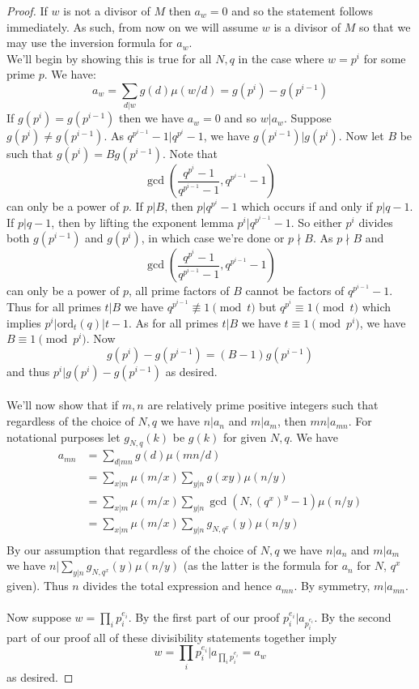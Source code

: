 \documentclass{article}
\newcommand{\ord}[0]{\mathrm{ord}}
\theoremstyle{definition}
\theoremstyle{definition}
\theoremstyle{remark}
\begin{document}
\begin{proof}
If $w$ is not a divisor of $M$ then $a_w = 0$ and so the statement follows immediately. As such, from now on we will assume $w$ is a divisor of $M$ so that we may use the inversion formula for $a_w$.
\\
We'll begin by showing this is true for all $N,q$ in the case where $w = p^i$ for some prime $p$. We have:
\[a_w = \sum_{d|w} g(d)\mu(w/d) = g(p^i) - g(p^{i-1})\]
If $g(p^i) = g(p^{i-1})$ then we have $a_w = 0$ and so $w | a_w$. Suppose $g(p^i) \neq g(p^{i-1})$. As $q^{p^{i-1}} -1 | q^{p^i} - 1$, we have $g(p^{i-1}) | g(p^i)$. Now let $B$ be such that $g(p^i) = Bg(p^{i-1})$. Note that 
\[\gcd\left(\frac{q^{p^i} - 1}{q^{p^{i-1}} - 1},q^{p^{i-1}} - 1\right)\]
can only be a power of $p$. If $p|B$, then $p|q^{p^i} - 1$ which occurs if and only if $p | q - 1$. If $p | q - 1$, then by lifting the exponent lemma $p^i | q^{p^{i - 1}} - 1$. So either $p^i$ divides both  $g(p^{i-1})$ and $g(p^{i})$, in which case we're done or $p\nmid B$. As $p \nmid B$ and 
\[\gcd\left(\frac{q^{p^i} - 1}{q^{p^{i-1}} - 1},q^{p^{i-1}} - 1\right)\]
can only be a power of $p$, all prime factors of $B$ cannot be factors of $q^{p^{i-1}} - 1$. Thus for all primes $t|B$ we have $q^{p^{i-1}} \not\equiv 1 \pmod t$ but $q^{p^i} \equiv 1 \pmod t$ which implies $p^i | \ord_t(q) | t - 1$. As for all primes $t | B$ we have $t \equiv 1 \pmod p^i$, we have $B \equiv 1 \pmod p^i$. Now 
\[g(p^i) - g(p^{i-1}) = (B-1)g(p^{i-1})\]
and thus $p^i | g(p^i) - g(p^{i-1})$ as desired.
\\
\\
We'll now show that if $m,n$ are relatively prime positive integers such that regardless of the choice of $N,q$ we have $n|a_n$ and $m|a_m$, then $mn|a_{mn}$. For notational purposes let $g_{N,q}(k)$ be $g(k)$ for given $N,q$. We have
\begin{align*}
a_{mn} &= \sum_{d | mn} g(d)\mu(mn/d) \\
&= \sum_{x|m}\mu(m/x)\sum_{y|n} g(xy)\mu(n/y) \\
&= \sum_{x|m}\mu(m/x)\sum_{y|n} \gcd(N, (q^{x})^y - 1)\mu(n/y) \\
&= \sum_{x|m}\mu(m/x)\sum_{y|n} g_{N,q^x}(y)\mu(n/y) \\
\end{align*}
By our assumption that regardless of the choice of $N,q$ we have $n|a_n$ and $m|a_m$ we have $n | \sum_{y|n} g_{N,q^x}(y)\mu(n/y)$ (as the latter is the formula for $a_n$ for $N$, $q^x$ given). Thus $n$ divides the total expression and hence $a_{mn}$. By symmetry, $m | a_{mn}$.
\\
\\
Now suppose $w = \prod_{i} p_i^{e_i}$. By the first part of our proof $p_i^{e_i} | a_{p_i^{e_i}}$. By the second part of our proof all of these divisibility statements together imply 
\[ w = \prod_{i} p_i^{e_i} | a_{\prod_{i} p_i^{e_i}} = a_w \]
as desired.
\end{proof}
\end{document}
